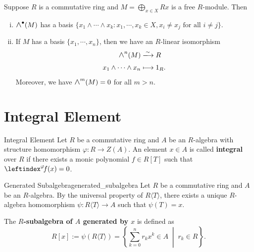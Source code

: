 \begin{proposition}{}{}
    Suppose $R$ is a commutative ring and $M=\bigoplus_{x\in X}Rx$ is a free $R$-module. Then
    \begin{enumerate}[(i)]
        \item $\Largewedge^{\bullet}(M)$ has a basis $\{x_1\wedge\cdots\wedge x_k: x_1,\cdots,x_k\in X, x_i\ne x_j\text{ for all }i\ne j\}$.
        \item If $M$ has a basis $\{x_1,\cdots,x_n\}$, then we have an $R$-linear isomorphism
        \begin{align*}
            \largewedge^{n}(M)&\xlongrightarrow{\sim} R\\
            x_1 \wedge \cdots \wedge x_n& \longmapsto 1_R.
        \end{align*}
        Moreover, we have $\Largewedge^{m}(M)=0$ for all $m>n$.
    \end{enumerate}
\end{proposition}
\section{Integral Element}

\begin{definition}{Integral Element}{}
    Let $R$ be a commutative ring and $A$ be an $R$-algebra with structure homomorphism $\varphi:R\to Z(A)$. An element $x\in A$ is called \textbf{integral} over $R$ if there exists a monic polynomial $f\in R[T]$ such that $\leftindex^{\varphi}\!f(x)=0$.
\end{definition}


\begin{definition}{Generated Subalgebra}{generated_subalgebra}
    Let $R$ be a commutative ring and $A$ be an $R$-algebra. By the universal property of $R\langle T\rangle$, there exists a unique $R$-algebra homomorphism $\psi:R\langle T\rangle\to A$ such that 
    $\psi(T)=x$.
    \begin{center}
    \end{center}
    The \textbf{$R$-subalgebra of $A$ generated by $x$} is defined as 
    \[
    R[x]:=\psi\left(R\langle T\rangle\right)=\left\{\sum_{k=0}^n r_k x^k \in A\;\middle|\; r_k\in R\right\}.
    \]
\end{definition}

